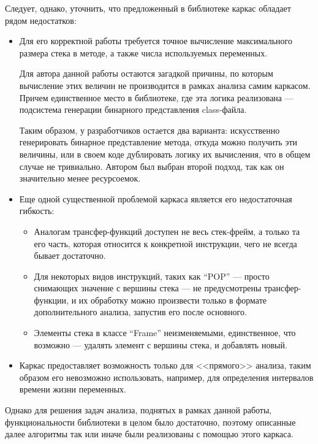 Следует, однако, уточнить, что предложенный в библиотеке каркас обладает рядом недостатков:
\begin{itemize}
    \item Для его корректной работы требуется точное вычисление максимального размера стека
    в методе, а также числа используемых переменных.

    Для автора данной работы остаются загадкой причины, по которым вычисление этих величин
    не производится в рамках анализа самим каркасом.
    Причем единственное место в библиотеке, где эта логика реализована --- подсистема генерации
    бинарного представления class-файла.

    Таким образом, у разработчиков остается два варианта: искусственно генерировать бинарное
    представление метода, откуда можно получить эти величины, или в своем коде дублировать логику
    их вычисления, что в общем случае не тривиально.
    Автором был выбран второй подход, так как он значительно менее ресурсоемок.

    \item Еще одной существенной проблемой каркаса является его недостаточная гибкость:
    \begin{itemize}
        \item Аналогам трансфер-функций доступен не весь стек-фрейм, а только та его часть,
        которая относится к конкретной инструкции, чего не всегда бывает достаточно.

        \item Для некоторых видов инструкций, таких как ``POP'' --- просто снимающих значение
        с вершины стека --- не предусмотрены трансфер-функции, и их обработку можно произвести
        только в формате дополнительного анализа, запустив его после основного.

        \item Элементы стека в классе ``Frame'' неизменяемыми, единственное, что возможно ---
        удалять элемент с вершины стека, и добавлять новый.
    \end{itemize}

    \item Каркас предоставляет возможность только для <<прямого>> анализа, таким образом его
    невозможно использовать, например, для определения интервалов времени жизни переменных.
\end{itemize}

Однако для решения задач анализа, поднятых в рамках данной работы, функциональности библиотеки
в целом было достаточно, поэтому описанные далее алгоритмы так или иначе были реализованы
с помощью этого каркаса.

